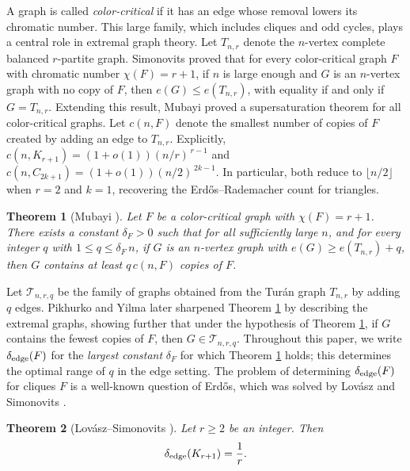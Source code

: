 \documentclass[11pt,a4paper]{article}
\newtheorem{theorem}{Theorem}[section]
\theoremstyle{definition}
\theoremstyle{plain}
\renewcommand{\le}{\leqslant}
\renewcommand{\ge}{\geqslant}
\begin{document}
\smallskip 
A graph is called {\it color-critical} if it has an edge
whose removal lowers its chromatic number. This large
family, which includes cliques and odd cycles, plays a
central role in extremal graph theory. Let $T_{n,r}$
denote the $n$-vertex complete balanced $r$-partite
graph. Simonovits \cite{Sim1966} proved that for every
color-critical graph $F$ with chromatic number
$\chi(F)=r+1$, if $n$ is large enough and $G$ is an
$n$-vertex graph with no copy of $F$, then
$e(G)\le e(T_{n,r})$, with equality if and only if
$G=T_{n,r}$. 
Extending this result, Mubayi \cite{Mubayi2010} proved a
supersaturation theorem for all color-critical graphs. 
Let $c(n,F)$ denote the
smallest number of copies of $F$ created by adding an 
 edge to $T_{n,r}$.  
 Explicitly, $c(n,K_{r+1})=(1+o(1))(n/r)^{\,r-1}$ and $c(n,C_{2k+1})=(1+o(1))(n/2)^{\,2k-1}$.
In particular, both reduce to $\lfloor n/2\rfloor$ when $r=2$ and $k=1$, recovering the
Erd\H{o}s--Rademacher count for triangles. 

\begin{theorem}[Mubayi \cite{Mubayi2010}] \label{thm-Mubayi} 
Let $F$ be a color-critical graph with $\chi(F)=r+1$.
There exists a constant $\delta_F>0$ such that for all sufficiently large $n$, and for every integer $q$ with  
$1\le q\le\delta_F \,n$, if $G$ is an $n$-vertex graph 
with $e(G)\ge e(T_{n,r})+q$, 
then  $G$ contains at least $q\, c(n,F)$ copies of $F$.
\end{theorem}

Let $\mathcal{T}_{n,r,q}$
be the family of graphs obtained from the Tur\'{a}n graph  $T_{n,r}$ by
adding $q$ edges. 
Pikhurko and Yilma \cite{PY2017} later
sharpened Theorem \ref{thm-Mubayi} by describing the extremal graphs, showing further that under the hypothesis of Theorem \ref{thm-Mubayi}, 
 if $G$ contains the fewest copies of $F$, then $G\in\mathcal{T}_{n,r,q}$. 
Throughout this paper, 
we write $\delta_{\rm edge}(F)$ for the {\it largest constant} $\delta_F$ for
which Theorem \ref{thm-Mubayi} holds; this determines the optimal range  
of $q$ in the edge setting. 
The problem of determining $\delta_{\rm edge}(F)$ 
for cliques $F$ is a well-known question of Erd\H{o}s,
which was solved by  
Lov\'asz and Simonovits
\cite{LS1983}. 

\begin{theorem}[Lov\'asz--Simonovits
\cite{LS1983}]  \label{thm-edge-clique}
Let $r\ge 2$ be an integer. Then 
$$\delta_{\rm edge}(K_{r+1})= \frac{1}{ r}.$$ 
\end{theorem}
\end{document}
